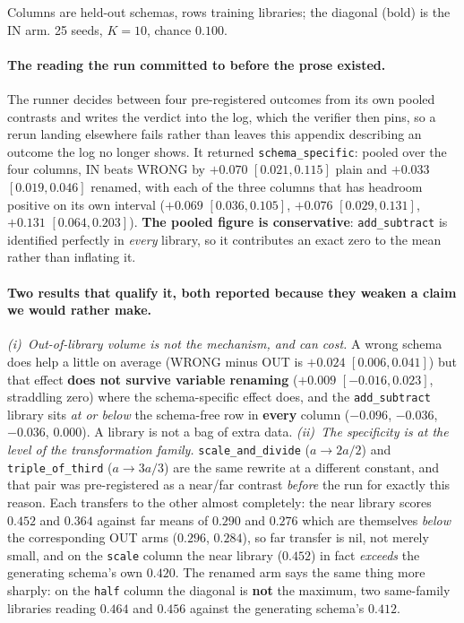 \noindent Columns are held-out schemas, rows training libraries; the diagonal (bold) is the IN arm. 25 seeds, $K{=}10$, chance $0.100$.

\paragraph{The reading the run committed to before the prose existed.} The runner decides between four pre-registered outcomes from its own pooled contrasts and writes the verdict into the log, which the verifier then pins, so a rerun landing elsewhere fails rather than leaves this appendix describing an outcome the log no longer shows. It returned \texttt{schema\_specific}: pooled over the four columns, IN beats WRONG by $+0.070$ $[0.021,0.115]$ plain and $+0.033$ $[0.019,0.046]$ renamed, with each of the three columns that has headroom positive on its own interval ($+0.069$ $[0.036,0.105]$, $+0.076$ $[0.029,0.131]$, $+0.131$ $[0.064,0.203]$). \textbf{The pooled figure is conservative}: \texttt{add\_subtract} is identified perfectly in \emph{every} library, so it contributes an exact zero to the mean rather than inflating it.

\paragraph{Two results that qualify it, both reported because they weaken a claim we would rather make.} \emph{(i)~Out-of-library volume is not the mechanism, and can cost.} A wrong schema does help a little on average (WRONG minus OUT is $+0.024$ $[0.006,0.041]$) but that effect \textbf{does not survive variable renaming} ($+0.009$ $[-0.016,0.023]$, straddling zero) where the schema-specific effect does, and the \texttt{add\_subtract} library sits \emph{at or below} the schema-free row in \textbf{every} column ($-0.096$, $-0.036$, $-0.036$, $0.000$). A library is not a bag of extra data. \emph{(ii)~The specificity is at the level of the transformation family.} \texttt{scale\_and\_divide} ($a \to 2a/2$) and \texttt{triple\_of\_third} ($a \to 3a/3$) are the same rewrite at a different constant, and that pair was pre-registered as a near/far contrast \emph{before} the run for exactly this reason. Each transfers to the other almost completely: the near library scores $0.452$ and $0.364$ against far means of $0.290$ and $0.276$ which are themselves \emph{below} the corresponding OUT arms ($0.296$, $0.284$), so far transfer is nil, not merely small, and on the \texttt{scale} column the near library ($0.452$) in fact \emph{exceeds} the generating schema's own $0.420$. The renamed arm says the same thing more sharply: on the \texttt{half} column the diagonal is \textbf{not} the maximum, two same-family libraries reading $0.464$ and $0.456$ against the generating schema's $0.412$.

